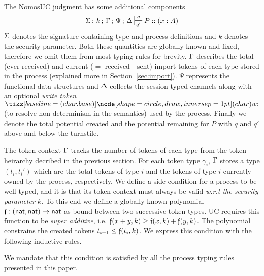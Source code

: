 The NomosUC judgment has some additional components
\[
\Sg \semi k \semi \Tokens \semi \Psi \semi \D \entailpot{q}{q'} P :: (x : A)
\]
$\Sigma$ denotes the signature containing type and process definitions and $k$
denotes the security parameter.
Both these quantities are globally known and fixed, therefore we omit them from
most typing rules for brevity.
$\Gamma$ describes the total (ever received) and current ($=$ received - sent) import tokens
of each type stored in the process (explained more in Section~\ref{sec:import}).
$\Psi$ represents the functional data structures and $\Delta$ collects the
session-typed channels along with an optional \emph{write token} $\wt$
(to resolve non-determinism in the semantics) used by the process.
Finally we denote the total potential created and the potential remaining for $P$ with $q$ and $q'$ above and below the turnstile.

The token context $\Gamma$ tracks the number of tokens of each type from the token heirarchy decribed in the previous section.
For each token type $\gamma_i$, $\Gamma$ stores a type $(t_i,t_i')$ which are the total tokens of type $i$ and the tokens of type $i$ currently owned by the process, respectively. 
We define a side condition for a process to be well-typed, and it is that its token context must always be valid \emph{w.r.t the security parameter $k$}.
To this end we define a globally known polynomial $\mathfrak{f} : ({\mathsf {nat}}, {\mathsf {nat}}) \rightarrow {\mathsf {nat}}$ as bound between two successive token types. UC requires this function to be \emph{super additive}, i.e. $\mathfrak{f}(x+y,k) \geq \mathfrak{f}(x,k) + \mathfrak{f}(y,k)$.
The polynomial constrains the created tokens $t_{i+1} \leq \mathfrak{f}(t_i, k)$.
We express this condition with the following inductive rules.
We mandate that this condition is satisfied by all the process typing rules presented in this paper.

